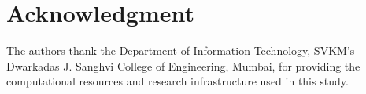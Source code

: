 \documentclass[conference]{IEEEtran}
\begin{document}
\section*{Acknowledgment}
The authors thank the Department of Information Technology, SVKM's Dwarkadas J. Sanghvi College of Engineering, Mumbai, for providing the computational resources and research infrastructure used in this study.



\end{document}
